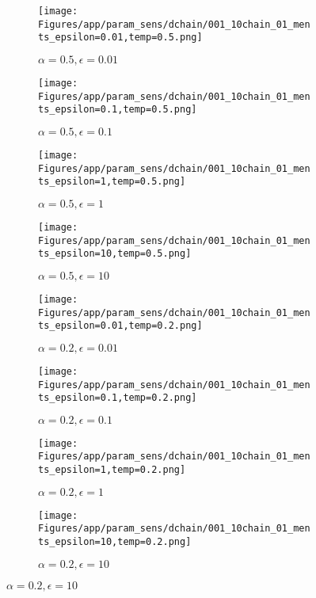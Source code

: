\documentclass{article}
\theoremstyle{plain}
\begin{document}
\begin{appendices}
\begin{figure}
                \begin{subfigure}[b]{0.24\textwidth}
                    \centering
                    \texttt{[image: Figures/app/param\_sens/dchain/001\_10chain\_01\_ments\_epsilon=0.01,temp=0.5.png]}
                    \caption*{$\alpha=0.5,\epsilon=0.01$}
                \end{subfigure}
                \begin{subfigure}[b]{0.24\textwidth}
                    \centering
                    \texttt{[image: Figures/app/param\_sens/dchain/001\_10chain\_01\_ments\_epsilon=0.1,temp=0.5.png]}
                    \caption*{$\alpha=0.5,\epsilon=0.1$}
                \end{subfigure}
                \begin{subfigure}[b]{0.24\textwidth}
                    \centering
                    \texttt{[image: Figures/app/param\_sens/dchain/001\_10chain\_01\_ments\_epsilon=1,temp=0.5.png]}
                    \caption*{$\alpha=0.5,\epsilon=1$}
                \end{subfigure}
                \begin{subfigure}[b]{0.24\textwidth}
                    \centering
                    \texttt{[image: Figures/app/param\_sens/dchain/001\_10chain\_01\_ments\_epsilon=10,temp=0.5.png]}
                    \caption*{$\alpha=0.5,\epsilon=10$}
                \end{subfigure}
                
                \begin{subfigure}[b]{0.24\textwidth}
                    \centering
                    \texttt{[image: Figures/app/param\_sens/dchain/001\_10chain\_01\_ments\_epsilon=0.01,temp=0.2.png]}
                    \caption*{$\alpha=0.2,\epsilon=0.01$}
                \end{subfigure}
                \begin{subfigure}[b]{0.24\textwidth}
                    \centering
                    \texttt{[image: Figures/app/param\_sens/dchain/001\_10chain\_01\_ments\_epsilon=0.1,temp=0.2.png]}
                    \caption*{$\alpha=0.2,\epsilon=0.1$}
                \end{subfigure}
                \begin{subfigure}[b]{0.24\textwidth}
                    \centering
                    \texttt{[image: Figures/app/param\_sens/dchain/001\_10chain\_01\_ments\_epsilon=1,temp=0.2.png]}
                    \caption*{$\alpha=0.2,\epsilon=1$}
                \end{subfigure}
                \begin{subfigure}[b]{0.24\textwidth}
                    \centering
                    \texttt{[image: Figures/app/param\_sens/dchain/001\_10chain\_01\_ments\_epsilon=10,temp=0.2.png]}
                    \caption*{$\alpha=0.2,\epsilon=10$}
                \end{subfigure}
                

\end{figure}
\end{appendices}
\end{document}
